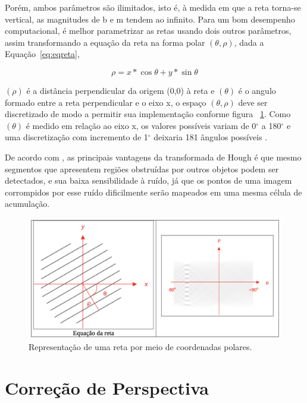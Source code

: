 Porém, ambos parâmetros são ilimitados, isto é, à medida em que a reta torna-se vertical, as magnitudes de b e m tendem ao infinito. Para um bom desempenho computacional, é melhor parametrizar as retas usando dois outros parâmetros, assim transformando a equação da reta na forma polar $(\theta, \rho)$, dada a Equação~\ref{eq:eqreta},

\begin{equation}
\rho = x*\cos{\theta} + y*\sin{\theta}
\label{eq:eqreta}
\end{equation}

$(\rho)$ é a distância perpendicular da origem (0,0) à reta e $(\theta)$ é o angulo formado entre a reta perpendicular e o eixo x, o espaço $(\theta, \rho)$ deve ser discretizado de modo a permitir sua implementação conforme figura ~\ref{fig:eqreta}. Como $(\theta)$ é medido em relação ao eixo x, os valores possíveis variam de 0$^{\circ}$ a 180$^{\circ}$ e uma discretização com incremento de 1$^{\circ}$ deixaria 181 ângulos possíveis \cite{PEDRINI2008}.

De acordo com , as principais vantagens da transformada de Hough é que mesmo segmentos que apresentem regiões obstruídas por outros objetos podem ser detectados, e sua baixa sensibilidade à ruído, já que os pontos de uma imagem corrompidos por esse ruído dificilmente serão mapeados em uma mesma célula de acumulação.

 \begin{figure}[h]
	\centering
	\includegraphics[width=1.0\textwidth]{Imagens/eqreta} 
	\caption[Representação de uma reta por meio de coordenadas polares.]{Representação de uma reta por meio de coordenadas polares.}
	\label{fig:eqreta}
\end{figure}


\section{Correção de Perspectiva}

